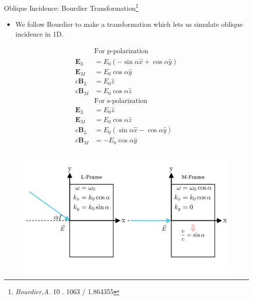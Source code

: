 \documentclass{beamer}
\begin{document}
\begin{frame}{Oblique Incidence: Bourdier Transformation\footnote{\textit{Bourdier,A. } 10 . 1063 / 1.864355}}
    \small
    \begin{itemize}
        \item We follow Bourdier to make a transformation which lets us simulate oblique incidence in 1D.
    \end{itemize}
    \begin{minipage}[t]{0.35\linewidth}
        \begin{align*}
            \begin{split}
                &\text{For p-polarization}\\
                \mathbf{E}_L  & = E_0(-\sin\alpha \hat{x} + \cos\alpha \hat{y}) \\
                \mathbf{E}_M  & = E_0\cos\alpha \hat{y}                         \\
                c\mathbf{B}_L & = E_0\hat{z}                                    \\
                c\mathbf{B}_M & = E_0\cos\alpha \hat{z}\\
                &\text{For s-polarization}\\
                \mathbf{E}_L & = E_0\hat{z}                                    \\
                \mathbf{E}_M & = E_0\cos\alpha \hat{z}                        \\
                c\mathbf{B}_L & = E_0(\sin\alpha \hat{x} - \cos\alpha \hat{y}) \\
                c\mathbf{B}_M & = -E_0\cos\alpha \hat{y}
            \end{split}
        \end{align*}

    \end{minipage}
    \begin{minipage}[t]{0.60\linewidth}
        \begin{figure}
            \centering
            \includegraphics[width=1.0\textwidth, height=0.62\textheight]{images/frames.png}
            \label{fig:frames}
        \end{figure}
    \end{minipage}
\end{frame}
\end{document}
